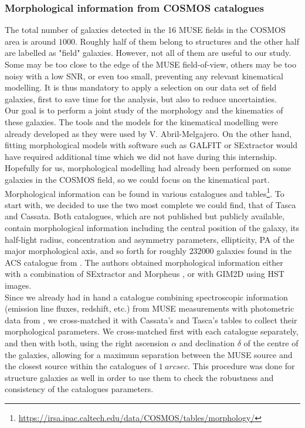 \subsubsection{Morphological information from COSMOS catalogues}

The total number of galaxies detected in the 16 MUSE fields in the COSMOS area is around $1000$. Roughly half of them belong to structures and the other half are labelled as "field" galaxies. However, not all of them are useful to our study. Some may be too close to the edge of the MUSE field-of-view, others may be too noisy with a low SNR, or even too small, preventing any relevant kinematical modelling. It is thus mandatory to apply a selection on our data set of field galaxies, first to save time for the analysis, but also to reduce uncertainties.\\

Our goal is to perform a joint study of the morphology and the kinematics of these galaxies. The tools and the models for the kinematical modelling were already developed as they were used by V. Abril-Melgajero. On the other hand, fitting morphological models with software such as GALFIT  or SExtractor  would have required additional time which we did not have during this internship. Hopefully for us, morphological modelling had already been performed on some galaxies in the COSMOS field, so we could focus on the kinematical part. \\

Morphological information can be found in various catalogues and tables\footnote{\url{https://irsa.ipac.caltech.edu/data/COSMOS/tables/morphology/}}. To start with, we decided to use the two most complete we could find, that of Tasca and Cassata. Both catalogues, which are not published but publicly available, contain morphological information including the central position of the galaxy, its half-light radius, concentration and asymmetry parameters, ellipticity, PA of the major morphological axis, and so forth for roughly $232 000$ galaxies found in the ACS catalogue from . The authors obtained morphological information either with a combination of SExtractor and Morpheus , or with GIM2D  using HST images. \\

Since we already had in hand a catalogue combining spectroscopic information (emission line fluxes, redshift, etc.) from MUSE measurements with photometric data from , we cross-matched it with Cassata's and Tasca's tables to collect their morphological parameters. We cross-matched first with each catalogue separately, and then with both, using the right ascension $\alpha$ and declination $\delta$ of the centre of the galaxies, allowing for a maximum separation between the MUSE source and the closest source within the catalogues of $\SI{1}{arcsec}$. This procedure was done for structure galaxies as well in order to use them to check the robustness and consistency of the catalogues parameters.



